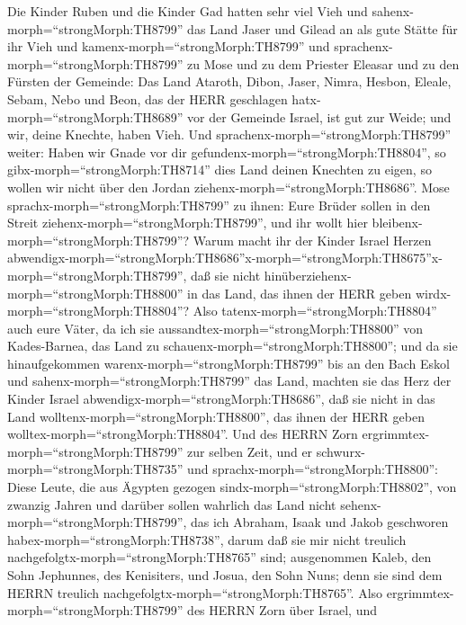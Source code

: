 Die Kinder Ruben und die Kinder Gad hatten sehr viel Vieh
und sahenx-morph=``strongMorph:TH8799'' das Land Jaser und Gilead an als
gute Stätte für ihr Vieh  und
kamenx-morph=``strongMorph:TH8799'' und
sprachenx-morph=``strongMorph:TH8799'' zu Mose und zu dem Priester
Eleasar und zu den Fürsten der Gemeinde:  Das Land Ataroth,
Dibon, Jaser, Nimra, Hesbon, Eleale, Sebam, Nebo und Beon, 
das der HERR geschlagen hatx-morph=``strongMorph:TH8689'' vor der
Gemeinde Israel, ist gut zur Weide; und wir, deine Knechte, haben Vieh.
 Und sprachenx-morph=``strongMorph:TH8799'' weiter: Haben
wir Gnade vor dir gefundenx-morph=``strongMorph:TH8804'', so
gibx-morph=``strongMorph:TH8714'' dies Land deinen Knechten zu eigen, so
wollen wir nicht über den Jordan ziehenx-morph=``strongMorph:TH8686''.
 Mose sprachx-morph=``strongMorph:TH8799'' zu ihnen: Eure
Brüder sollen in den Streit ziehenx-morph=``strongMorph:TH8799'', und
ihr wollt hier bleibenx-morph=``strongMorph:TH8799''?  Warum
macht ihr der Kinder Israel Herzen
abwendigx-morph=``strongMorph:TH8686''\textbar x-morph=``strongMorph:TH8675''x-morph=``strongMorph:TH8799'',
daß sie nicht hinüberziehenx-morph=``strongMorph:TH8800'' in das Land,
das ihnen der HERR geben wirdx-morph=``strongMorph:TH8804''?
 Also tatenx-morph=``strongMorph:TH8804'' auch eure Väter,
da ich sie aussandtex-morph=``strongMorph:TH8800'' von Kades-Barnea, das
Land zu schauenx-morph=``strongMorph:TH8800'';  und da sie
hinaufgekommen warenx-morph=``strongMorph:TH8799'' bis an den Bach Eskol
und sahenx-morph=``strongMorph:TH8799'' das Land, machten sie das Herz
der Kinder Israel abwendigx-morph=``strongMorph:TH8686'', daß sie nicht
in das Land wolltenx-morph=``strongMorph:TH8800'', das ihnen der HERR
geben wolltex-morph=``strongMorph:TH8804''.  Und des HERRN
Zorn ergrimmtex-morph=``strongMorph:TH8799'' zur selben Zeit, und er
schwurx-morph=``strongMorph:TH8735'' und
sprachx-morph=``strongMorph:TH8800'':  Diese Leute, die aus
Ägypten gezogen sindx-morph=``strongMorph:TH8802'', von zwanzig Jahren
und darüber sollen wahrlich das Land nicht
sehenx-morph=``strongMorph:TH8799'', das ich Abraham, Isaak und Jakob
geschworen habex-morph=``strongMorph:TH8738'', darum daß sie mir nicht
treulich nachgefolgtx-morph=``strongMorph:TH8765'' sind; 
ausgenommen Kaleb, den Sohn Jephunnes, des Kenisiters, und Josua, den
Sohn Nuns; denn sie sind dem HERRN treulich
nachgefolgtx-morph=``strongMorph:TH8765''.  Also
ergrimmtex-morph=``strongMorph:TH8799'' des HERRN Zorn über Israel, und
